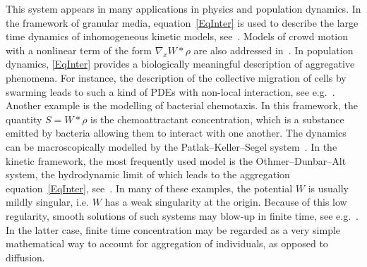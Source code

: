 \documentclass[11pt]{article}
\theoremstyle{definition}
\numberwithin{equation}{section}
\begin{document}
This system appears in many applications in physics and population dynamics. In the framework of granular media, equation~\eqref{EqInter} is used to describe the large time dynamics of inhomogeneous kinetic models, see~\cite{benedetto,CCV,Toscani}. Models of crowd motion with a nonlinear term of the form $\nabla_xW*\rho$ are also addressed in~\cite{pieton,pieton2}. In population dynamics, \eqref{EqInter} provides a biologically meaningful description of aggregative phenomena. For instance, the description of the collective migration of cells by swarming leads to such a kind of PDEs with non-local interaction, see e.g.~\cite{morale,okubo,topaz}. Another example is the modelling of bacterial chemotaxis. In this framework, the quantity $S=W*\rho$ is the chemoattractant concentration, which is a substance emitted by bacteria allowing them to interact with one another. The dynamics can be macroscopically modelled by the Patlak--Keller--Segel system~\cite{keller,patlack}. In the kinetic framework, the most frequently used model is the Othmer--Dunbar--Alt system, the hydrodynamic limit of which leads to the aggregation equation~\eqref{EqInter}, see~\cite{dolschmeis,filblaurpert,NoDEA}. In many of these examples, the potential $W$ is usually mildly singular, i.e. $W$ has a weak singularity at the origin. Because of this low regularity, smooth solutions of such systems may blow-up in finite time, see e.g.~\cite{BV,Bertozzi2,Carrillo,Li}. In the latter case, finite time concentration may be regarded as a very simple mathematical way to account for aggregation of individuals, as opposed to diffusion.
\end{document}
